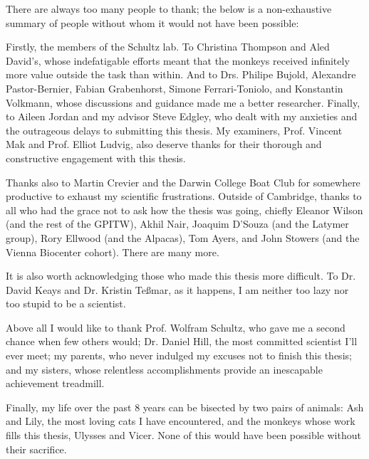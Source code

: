 
\begin{acknowledgements}


There are always too many people to thank; the below is a non-exhaustive summary of people without whom it would not have been possible:

Firstly, the members of the Schultz lab. To Christina Thompson and Aled David's, whose indefatigable efforts meant that the monkeys received infinitely more value outside the task than within. And to Drs. Philipe Bujold, Alexandre Pastor-Bernier, Fabian Grabenhorst, Simone Ferrari-Toniolo, and Konstantin Volkmann, whose discussions and guidance made me a better researcher. Finally, to Aileen Jordan and my advisor Steve Edgley, who dealt with my anxieties and the outrageous delays to submitting this thesis. My examiners, Prof. Vincent Mak and Prof. Elliot Ludvig, also deserve thanks for their thorough and constructive engagement with this thesis.

Thanks also to Martin Crevier and the Darwin College Boat Club for somewhere productive to exhaust my scientific frustrations. Outside of Cambridge, thanks to all who had the grace not to ask how the thesis was going, chiefly Eleanor Wilson (and the rest of the GPITW), Akhil Nair, Joaquim D'Souza (and the Latymer group), Rory Ellwood (and the Alpacas), Tom Ayers, and John Stowers (and the Vienna Biocenter cohort). There are many more.

It is also worth acknowledging those who made this thesis more difficult. To Dr. David Keays and Dr. Kristin Teßmar, as it happens, I am neither too lazy nor too stupid to be a scientist.

Above all I would like to thank Prof. Wolfram Schultz, who gave me a second chance when few others would; Dr. Daniel Hill, the most committed scientist I'll ever meet; my parents, who never indulged my excuses not to finish this thesis; and my sisters, whose relentless accomplishments provide an inescapable achievement treadmill.

Finally, my life over the past 8 years can be bisected by two pairs of animals: Ash and Lily, the most loving cats I have encountered, and the monkeys whose work fills this thesis, Ulysses and Vicer. None of this would have been possible without their sacrifice.
\end{acknowledgements}
